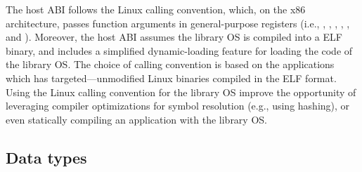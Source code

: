 The host ABI follows the Linux calling convention,
which, on the x86 architecture, passes function arguments in general-purpose registers (i.e., , , , , , and ).
Moreover, the host ABI assumes the library OS is compiled into a ELF binary, and includes a simplified dynamic-loading feature for loading the code of the library OS.
The choice of calling convention is based on
the applications which \graphene{} has targeted---unmodified Linux binaries compiled in the ELF format.
Using the Linux calling convention for the library OS
improve the opportunity of leveraging compiler optimizations for symbol resolution (e.g., using hashing), or even statically compiling an application with the library OS. 












\subsection{Data types}

